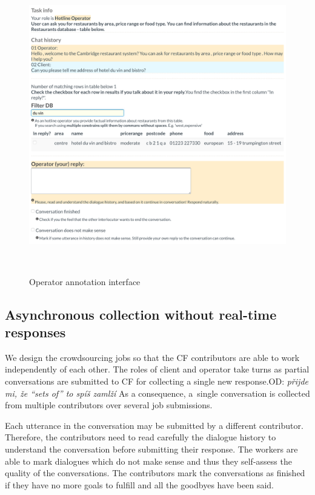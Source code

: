 \documentclass[runningheads,a4paper]{llncs}
\def\OD#1{{\color{darkgreen}OD: \it #1}}
\begin{document}
\begin{figure}[tb]
\vspace{-1.00em}
\begin{center}
\includegraphics[height=35em]{gui-annotators-system}
\caption{Operator annotation interface}
\end{center}
\vspace{-1.00em}
\label{fig:operator}
\end{figure}
\vspace{-1.00em}

\vspace{-1.00em}
\subsection{Asynchronous collection without real-time responses}
\label{sec:async}
We design the crowdsourcing jobs so that the CF contributors are able to work independently of each other.
The roles of client and operator take turns as partial conversations are submitted to CF for collecting a single new response.\OD{přijde mi, že “sets of” to spíš zamlží}
As a consequence, a~single conversation is collected from multiple contributors over several job submissions.

Each utterance in the conversation may be submitted by a different contributor. Therefore, the contributors need to read carefully the dialogue history to understand the conversation before submitting their response.
The workers are able to mark dialogues which do not make sense and thus they self-assess the quality of the conversations.
The contributors mark the conversations as finished if they have no more goals to fulfill and all the goodbyes have been said.
\end{document}
